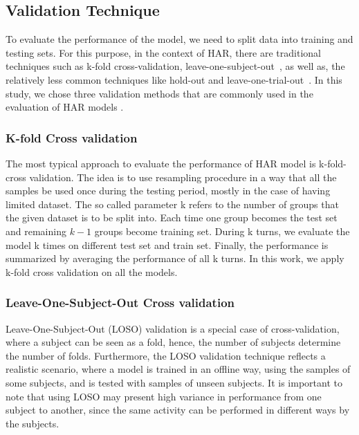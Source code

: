 \documentclass[journal,article,submit,moreauthors,pdftex]{Definitions/mdpi}
\begin{document}
\subsection{Validation Technique}
To evaluate the performance of the model, we need to split data into training and testing sets. For this purpose, in the context of HAR, there are traditional techniques such as k-fold cross-validation, leave-one-subject-out~\cite{jordao2018human}, as well as, the relatively less common techniques like hold-out and leave-one-trial-out~\cite{sena2018multiscale}. In this study, we chose three validation methods that are commonly used in the evaluation of HAR models \cite{wang2019survey}. 

\subsubsection{K-fold Cross validation}
The most typical approach to evaluate the performance of HAR model is k-fold-cross validation. The idea is to use resampling procedure in a way that all the samples be used once during the testing period, mostly in the case of having limited dataset. The so called parameter k refers to the number of groups that the given dataset is to be split into. Each time one group becomes the test set and remaining $k-1$ groups become training set. During k turns, we evaluate the model k times on different test set and train set. Finally, the performance is summarized by averaging the performance of all k turns. In this work, we apply k-fold cross validation on all the models.

\subsubsection{Leave-One-Subject-Out Cross validation}
Leave-One-Subject-Out (LOSO) validation is a special case of cross-validation, where a subject can be seen as a fold, hence, the number of subjects determine the number of folds. Furthermore, the LOSO validation technique reflects a realistic scenario, where a model is trained in an offline way, using the samples of some subjects, and is tested with samples of unseen subjects. It is important to note that using LOSO may present high variance in performance from one subject to another, since the same activity can be performed in different ways by the subjects. 
\end{document}
